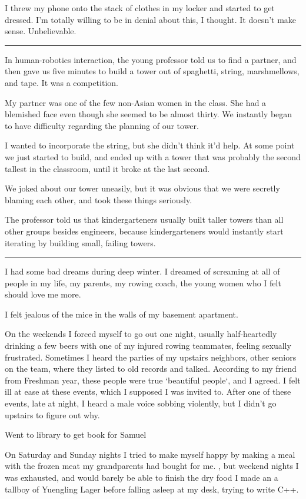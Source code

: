 I threw my phone onto the stack of clothes in my locker and started to get
dressed.  I'm totally willing to be in denial about this, I thought.  It doesn't
make sense.  Unbelievable. 

\plainfancybreak{12pt}{2}{* * *}

In human-robotics interaction, the young professor told us to find a partner,
and then gave us five minutes to build a tower out of spaghetti, string,
marshmellows, and tape.  It was a competition.

My partner was one of the few non-Asian women in the class.  She had a blemished
face even though she seemed to be almost thirty.  We instantly began to have
difficulty regarding the planning of our tower.  

I wanted to incorporate the string, but she didn't think it'd help.  At some
point we just started to build, and ended up with a tower that was probably the
second tallest in the classroom, until it broke at the last second.

We joked about our tower uneasily, but it was obvious that we were secretly
blaming each other, and took these things seriously.

The professor told us that kindergarteners usually built taller towers than all
other groups besides engineers, because kindergarteners would instantly start
iterating by building small, failing towers. 

\plainfancybreak{12pt}{2}{* * *}

I had some bad dreams during deep winter.  I dreamed of screaming at all of
people in my life, my parents, my rowing coach, the young women who I felt
should love me more.  

I felt jealous of the mice in the walls of my basement apartment.

On the weekends I forced myself to go out one night, usually half-heartedly
drinking a few beers with one of my injured rowing teammates, feeling sexually
frustrated.  Sometimes I heard the parties of my upstairs neighbors, other
seniors on the team, where they listed to old records and talked.  According to
my friend from Freshman year, these people were true `beautiful people`, and I
agreed.  I felt ill at ease at these events, which I supposed I was invited to.
After one of these events, late at night, I heard a male voice sobbing
violently, but I didn't go upstairs to figure out why.

Went to library to get book for Samuel

On Saturday and Sunday nights I tried to make myself happy by making a meal with
the frozen meat my grandparents had bought for me.  , but weekend nights I was
exhausted, and would barely be able to finish the dry food I made an a tallboy
of Yuengling Lager before falling asleep at my desk, trying to write C++.

